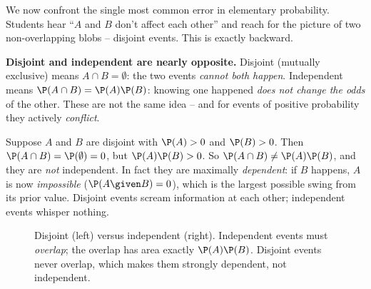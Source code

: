 We now confront the single most common error in elementary probability. Students hear ``$A$ and $B$ don't affect each other'' and reach for the picture of two non-overlapping blobs -- disjoint events. This is exactly backward.

\begin{trapbox}
\textbf{Disjoint and independent are nearly opposite.} Disjoint (mutually exclusive) means $A \cap B = \emptyset$: the two events \emph{cannot both happen}. Independent means $\P(A\cap B) = \P(A)\P(B)$: knowing one happened \emph{does not change the odds} of the other. These are not the same idea -- and for events of positive probability they actively \emph{conflict}.

Suppose $A$ and $B$ are disjoint with $\P(A) > 0$ and $\P(B) > 0$. Then $\P(A\cap B) = \P(\emptyset) = 0$, but $\P(A)\P(B) > 0$. So $\P(A \cap B) \ne \P(A)\P(B)$, and they are \emph{not} independent. In fact they are maximally \emph{dependent}: if $B$ happens, $A$ is now \emph{impossible} ($\P(A\given B) = 0$), which is the largest possible swing from its prior value. Disjoint events scream information at each other; independent events whisper nothing.
\end{trapbox}

\begin{figure}[H]
\centering
{}
\vspace{0.9em}
\caption{Disjoint (left) versus independent (right). Independent events must \emph{overlap}; the overlap has area exactly $\P(A)\P(B)$. Disjoint events never overlap, which makes them strongly dependent, not independent.}
\label{ch04:fig-disjoint-vs-indep}
\end{figure}


